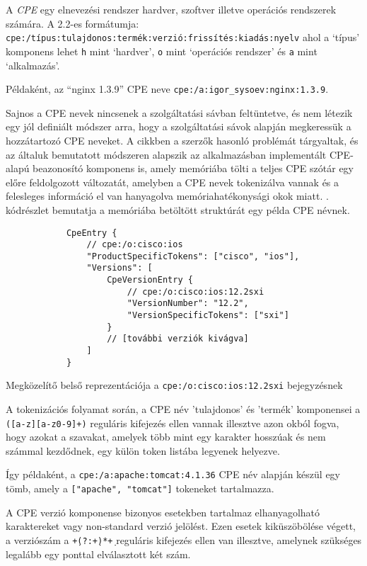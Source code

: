 	A \textit{CPE} egy elnevezési rendszer hardver, szoftver illetve operációs rendszerek számára\cite{cpe22}. A 2.2-es formátumja: \texttt{cpe:/típus:tulajdonos:termék:verzió:frissítés:kiadás:nyelv} ahol a `típus' komponens lehet \texttt{h} mint `hardver', \texttt{o} mint `operációs rendszer' és \texttt{a} mint `alkalmazás'.
	
	Példaként, az ``nginx 1.3.9'' CPE neve \texttt{cpe:/a:igor_sysoev:nginx:1.3.9}.
	
	Sajnos a CPE nevek nincsenek a szolgáltatási sávban feltüntetve, és nem létezik egy jól definiált módszer arra, hogy a szolgáltatási sávok alapján megkeressük a hozzátartozó CPE neveket. A \cite{shovat15} cikkben a szerzők hasonló problémát tárgyaltak, és az általuk bemutatott módszeren alapszik az alkalmazásban implementált CPE-alapú beazonosító komponens is, amely memóriába tölti a teljes CPE szótár egy előre feldolgozott változatát, amelyben a CPE nevek tokenizálva vannak és a felesleges információ el van hanyagolva memóriahatékonysági okok miatt. \Az{\ref{ciscotokens_hu}}. kódrészlet bemutatja a memóriába betöltött struktúrát egy példa CPE névnek.
	
	\begin{listing}[H]
		\begin{verbatim}
			CpeEntry {
				// cpe:/o:cisco:ios
				"ProductSpecificTokens": ["cisco", "ios"],
				"Versions": [
					CpeVersionEntry {
						// cpe:/o:cisco:ios:12.2sxi
						"VersionNumber": "12.2",
						"VersionSpecificTokens": ["sxi"]
					}
					// [további verziók kivágva]
				]
			}
		\end{verbatim}
		\caption{Megközelítő belső reprezentációja a \texttt{cpe:/o:cisco:ios:12.2sxi} bejegyzésnek}
		\label{ciscotokens_hu}
	\end{listing}
	
	A tokenizációs folyamat során, a CPE név 'tulajdonos' és 'termék' komponensei a \texttt{([a-z][a-z0-9]+)} reguláris kifejezés ellen vannak illesztve azon okból fogva, hogy azokat a szavakat, amelyek több mint egy karakter hosszúak és nem számmal kezdődnek, egy külön token listába legyenek helyezve.
	
	Így példaként, a \texttt{cpe:/a:apache:tomcat:4.1.36} CPE név alapján készül egy tömb, amely a \texttt{["apache", "tomcat"]} tokeneket tartalmazza.
	
	A CPE verzió komponense bizonyos esetekben tartalmaz elhanyagolható karaktereket vagy non-standard verzió jelölést. Ezen esetek kiküszöbölése végett, a verziószám a \texttt{\d+\.(?:\d+\.)*\d+} reguláris kifejezés ellen van illesztve, amelynek szükséges legalább egy ponttal elválasztott két szám.
	
